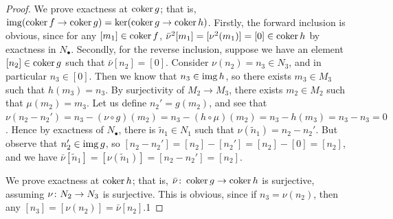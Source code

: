 \begin{proof}
    We prove exactness at \(\operatorname{coker} g\);
    that is, \(\operatorname{img}(\operatorname{coker} f \to \operatorname{coker} g) = \ker(\operatorname{coker} g \to \operatorname{coker} h)\).
    Firstly, the forward inclusion is obvious,
    since for any \([m_1] \in \operatorname{coker} f\),
    \(\bar{\nu}^2[m_1] = [\nu^2(m_1)] = [0] \in \operatorname{coker} h\)
    by exactness in \(N_\bullet\).
    Secondly, for the reverse inclusion,
    suppose we have an element \([n_2] \in \operatorname{coker} g\) such that \(\bar{\nu}[n_2] = [0]\).
    Consider \(\nu(n_2) = n_3 \in N_3\), and in particular \(n_3 \in [0]\).
    Then we know that \(n_3 \in \operatorname{img} h\),
    so there exists \(m_3 \in M_3\) such that \(h(m_3) = n_3\).
    By surjectivity of \(M_2 \to M_3\),
    there exists \(m_2 \in M_2\) such that \(\mu(m_2) = m_3\).
    Let us define \(n_2' = g(m_2)\),
    and see that \(\nu(n_2-n_2') = n_3-(\nu\circ g)(m_2) = n_3-(h\circ\mu)(m_2) = n_3 - h(m_3) = n_3-n_3 = 0\).
    Hence by exactness of \(N_\bullet\),
    there is \(\tilde{n}_1 \in N_1\) such that \(\nu(\tilde{n}_1) = n_2-n_2'\).
    But observe that \(n_2' \in \operatorname{img} g\), so \([n_2-n_2'] = [n_2]-[n_2'] = [n_2]-[0] = [n_2]\),
    and we have \(\bar{\nu}[\tilde{n}_1] = [\nu(\tilde{n}_1)] = [n_2-n_2'] = [n_2]\).

    We prove exactness at \(\operatorname{coker} h\);
    that is, \(\bar{\nu}\colon\operatorname{coker} g\to\operatorname{coker} h\) is surjective,
    assuming \(\nu\colon N_2\to N_3\) is surjective.
    This is obvious, since if \(n_3 = \nu(n_2)\),
    then any \([n_3] = [\nu(n_2)] = \bar{\nu}[n_2]\).1
\end{proof}


